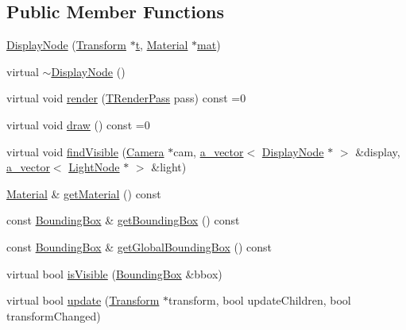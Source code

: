 \subsection*{Public Member Functions}
\begin{DoxyCompactItemize}
\item 
\hyperlink{class_agmd_1_1_display_node_a4f497a75b192c795061a9167710ef73f}{Display\+Node} (\hyperlink{class_agmd_maths_1_1_transform}{Transform} $\ast$\hyperlink{_examples_2_planet_2_app_8cpp_a125ce9f8ead659256dbdd0816ede24d4}{t}, \hyperlink{class_agmd_1_1_material}{Material} $\ast$\hyperlink{_examples_2_planet_2_app_8cpp_ab1c3784ff3dfc4e8cd95bfcb681f720b}{mat})
\item 
virtual \hyperlink{class_agmd_1_1_display_node_abb894413a0b84536608aa5ff7a16f15f}{$\sim$\+Display\+Node} ()
\item 
virtual void \hyperlink{class_agmd_1_1_display_node_a77a583f122dde9f7d2bfb1f10f7e47b0}{render} (\hyperlink{namespace_agmd_a893087981df53d0bf39466e9039aeb73}{T\+Render\+Pass} pass) const =0
\item 
virtual void \hyperlink{class_agmd_1_1_display_node_a13dd7059195a342e38cccc8989d317cb}{draw} () const =0
\item 
virtual void \hyperlink{class_agmd_1_1_display_node_aeecd3fa458a80f9d4f69f09bb7087f2e}{find\+Visible} (\hyperlink{class_agmd_1_1_camera}{Camera} $\ast$cam, \hyperlink{_vector_8h_a3df82cea60ff4ad0acb44e58454406a5}{a\+\_\+vector}$<$ \hyperlink{class_agmd_1_1_display_node}{Display\+Node} $\ast$ $>$ \&display, \hyperlink{_vector_8h_a3df82cea60ff4ad0acb44e58454406a5}{a\+\_\+vector}$<$ \hyperlink{class_agmd_1_1_light_node}{Light\+Node} $\ast$ $>$ \&light)
\item 
\hyperlink{class_agmd_1_1_material}{Material} \& \hyperlink{class_agmd_1_1_display_node_a28bd0df97f134c750e0a081c3a1cd962}{get\+Material} () const 
\item 
const \hyperlink{class_agmd_1_1_bounding_box}{Bounding\+Box} \& \hyperlink{class_agmd_1_1_display_node_af410729daa6f2afa23f58d6a54aa1886}{get\+Bounding\+Box} () const 
\item 
const \hyperlink{class_agmd_1_1_bounding_box}{Bounding\+Box} \& \hyperlink{class_agmd_1_1_display_node_a09f52bfa2ac908c9ca00a5182b57d894}{get\+Global\+Bounding\+Box} () const 
\item 
virtual bool \hyperlink{class_agmd_1_1_display_node_af2275c9f97b9a9fd9b2747afe1a7afdc}{is\+Visible} (\hyperlink{class_agmd_1_1_bounding_box}{Bounding\+Box} \&bbox)
\item 
virtual bool \hyperlink{class_agmd_1_1_display_node_ad82e625239b3c31f56a650703894e99e}{update} (\hyperlink{class_agmd_maths_1_1_transform}{Transform} $\ast$transform, bool update\+Children, bool transform\+Changed)
\end{DoxyCompactItemize}
